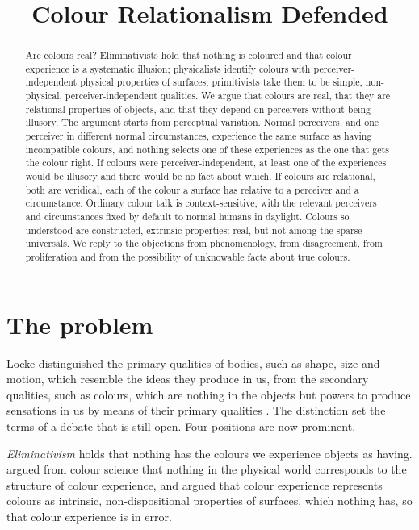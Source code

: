 \documentclass{situationist-preprint}
\title{Colour Relationalism Defended}
\begin{document}
\maketitle

\begin{abstract}
Are colours real? Eliminativists hold that nothing is coloured and that colour experience is a systematic illusion; physicalists identify colours with perceiver-independent physical properties of surfaces; primitivists take them to be simple, non-physical, perceiver-independent qualities. We argue that colours are real, that they are relational properties of objects, and that they depend on perceivers without being illusory. The argument starts from perceptual variation. Normal perceivers, and one perceiver in different normal circumstances, experience the same surface as having incompatible colours, and nothing selects one of these experiences as the one that gets the colour right. If colours were perceiver-independent, at least one of the experiences would be illusory and there would be no fact about which. If colours are relational, both are veridical, each of the colour a surface has relative to a perceiver and a circumstance. Ordinary colour talk is context-sensitive, with the relevant perceivers and circumstances fixed by default to normal humans in daylight. Colours so understood are constructed, extrinsic properties: real, but not among the sparse universals. We reply to the objections from phenomenology, from disagreement, from proliferation and from the possibility of unknowable facts about true colours.
\end{abstract}

\section{The problem}

Locke distinguished the primary qualities of bodies, such as shape, size and motion, which resemble the ideas they produce in us, from the secondary qualities, such as colours, which are nothing in the objects but powers to produce sensations in us by means of their primary qualities \citep[II.viii]{Locke1690}. The distinction set the terms of a debate that is still open. Four positions are now prominent.

\emph{Eliminativism} holds that nothing has the colours we experience objects as having. \citet{Hardin1988} argued from colour science that nothing in the physical world corresponds to the structure of colour experience, and \citet{BoghossianVelleman1989} argued that colour experience represents colours as intrinsic, non-dispositional properties of surfaces, which nothing has, so that colour experience is in error.
\end{document}
